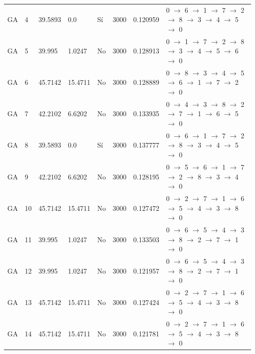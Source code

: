 \begin{table}[htbp]
\begin{tabular}{llllllll}
    GA & 4 & 39.5893 & 0.0 & Sí & 3000 & 0.120959 & 0 $\rightarrow$ 6 $\rightarrow$ 1 $\rightarrow$ 7 $\rightarrow$ 2 $\rightarrow$ 8 $\rightarrow$ 3 $\rightarrow$ 4 $\rightarrow$ 5 $\rightarrow$ 0 \\
    GA & 5 & 39.995 & 1.0247 & No & 3000 & 0.128913 & 0 $\rightarrow$ 1 $\rightarrow$ 7 $\rightarrow$ 2 $\rightarrow$ 8 $\rightarrow$ 3 $\rightarrow$ 4 $\rightarrow$ 5 $\rightarrow$ 6 $\rightarrow$ 0 \\
    GA & 6 & 45.7142 & 15.4711 & No & 3000 & 0.128889 & 0 $\rightarrow$ 8 $\rightarrow$ 3 $\rightarrow$ 4 $\rightarrow$ 5 $\rightarrow$ 6 $\rightarrow$ 1 $\rightarrow$ 7 $\rightarrow$ 2 $\rightarrow$ 0 \\
    GA & 7 & 42.2102 & 6.6202 & No & 3000 & 0.133935 & 0 $\rightarrow$ 4 $\rightarrow$ 3 $\rightarrow$ 8 $\rightarrow$ 2 $\rightarrow$ 7 $\rightarrow$ 1 $\rightarrow$ 6 $\rightarrow$ 5 $\rightarrow$ 0 \\
    GA & 8 & 39.5893 & 0.0 & Sí & 3000 & 0.137777 & 0 $\rightarrow$ 6 $\rightarrow$ 1 $\rightarrow$ 7 $\rightarrow$ 2 $\rightarrow$ 8 $\rightarrow$ 3 $\rightarrow$ 4 $\rightarrow$ 5 $\rightarrow$ 0 \\
    GA & 9 & 42.2102 & 6.6202 & No & 3000 & 0.128195 & 0 $\rightarrow$ 5 $\rightarrow$ 6 $\rightarrow$ 1 $\rightarrow$ 7 $\rightarrow$ 2 $\rightarrow$ 8 $\rightarrow$ 3 $\rightarrow$ 4 $\rightarrow$ 0 \\
    GA & 10 & 45.7142 & 15.4711 & No & 3000 & 0.127472 & 0 $\rightarrow$ 2 $\rightarrow$ 7 $\rightarrow$ 1 $\rightarrow$ 6 $\rightarrow$ 5 $\rightarrow$ 4 $\rightarrow$ 3 $\rightarrow$ 8 $\rightarrow$ 0 \\
    GA & 11 & 39.995 & 1.0247 & No & 3000 & 0.133503 & 0 $\rightarrow$ 6 $\rightarrow$ 5 $\rightarrow$ 4 $\rightarrow$ 3 $\rightarrow$ 8 $\rightarrow$ 2 $\rightarrow$ 7 $\rightarrow$ 1 $\rightarrow$ 0 \\
    GA & 12 & 39.995 & 1.0247 & No & 3000 & 0.121957 & 0 $\rightarrow$ 6 $\rightarrow$ 5 $\rightarrow$ 4 $\rightarrow$ 3 $\rightarrow$ 8 $\rightarrow$ 2 $\rightarrow$ 7 $\rightarrow$ 1 $\rightarrow$ 0 \\
    GA & 13 & 45.7142 & 15.4711 & No & 3000 & 0.127424 & 0 $\rightarrow$ 2 $\rightarrow$ 7 $\rightarrow$ 1 $\rightarrow$ 6 $\rightarrow$ 5 $\rightarrow$ 4 $\rightarrow$ 3 $\rightarrow$ 8 $\rightarrow$ 0 \\
    GA & 14 & 45.7142 & 15.4711 & No & 3000 & 0.121781 & 0 $\rightarrow$ 2 $\rightarrow$ 7 $\rightarrow$ 1 $\rightarrow$ 6 $\rightarrow$ 5 $\rightarrow$ 4 $\rightarrow$ 3 $\rightarrow$ 8 $\rightarrow$ 0 \\

\end{tabular}
\end{table}
